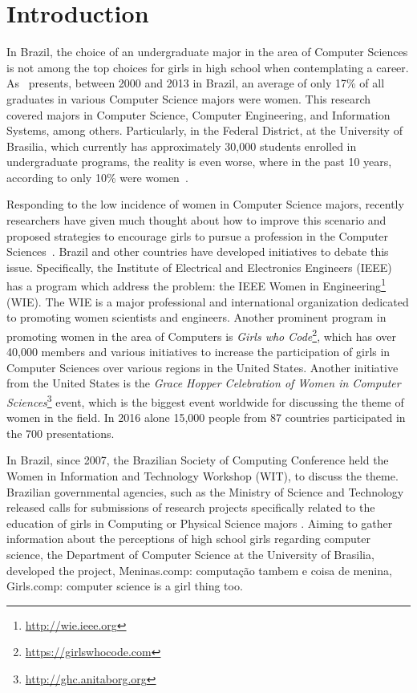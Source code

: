 \section{Introduction}\label{sec:intro}%

In Brazil, the choice of an undergraduate major in the area of Computer Sciences is not among the top choices for girls in high school when contemplating a career. As~\cite{maia_2016} presents, between 2000 and 2013 in Brazil, an average of only 17\% of all graduates in various Computer Science majors were women. This research covered majors in Computer Science, Computer Engineering, and Information Systems, among others. Particularly, in the Federal District, at the University of Brasilia, which currently has approximately 30,000 students enrolled in undergraduate programs, the reality is even worse, where in the past 10 years, according to only 10\% were women~\cite{couto_2014}.

Responding to the low incidence of women in Computer Science majors, recently researchers have given much thought about how to improve this scenario and proposed strategies to encourage girls to pursue a profession in the Computer Sciences~\cite{cohoon_2002,couto_2014,gurer_2002,maia_2016}. Brazil and other countries have developed initiatives to debate this issue. Specifically, the Institute of Electrical and Electronics Engineers (IEEE) has a program which address the problem: the IEEE Women in Engineering\footnote{\url{http://wie.ieee.org}} (WIE). The WIE is a major professional and international organization dedicated to promoting women scientists and engineers. Another prominent program in promoting women in the area of Computers is \emph{Girls who Code}\footnote{\url{https://girlswhocode.com}}, which has over 40,000 members and various initiatives to increase the participation of girls in Computer Sciences over various regions in the United States. Another initiative from the United States is the \emph{Grace Hopper Celebration of Women in Computer Sciences}\footnote{\url{http://ghc.anitaborg.org}} event, which is the biggest event worldwide for discussing the theme of women in the field. In 2016 alone 15,000 people from 87 countries participated in the 700 presentations.

In Brazil, since 2007, the Brazilian Society of Computing Conference held the Women in Information and Technology Workshop (WIT), to discuss the theme. Brazilian governmental agencies, such as the Ministry of Science and Technology released calls for submissions of research projects specifically related to the education of girls in Computing or Physical Science majors \cite{cnpq_2017}. Aiming to gather information about the perceptions of high school girls regarding computer science, the Department of Computer Science at the University of Brasilia, developed the project, Meninas.comp: computação  tambem e coisa de menina, Girls.comp: computer science is a girl thing too.

